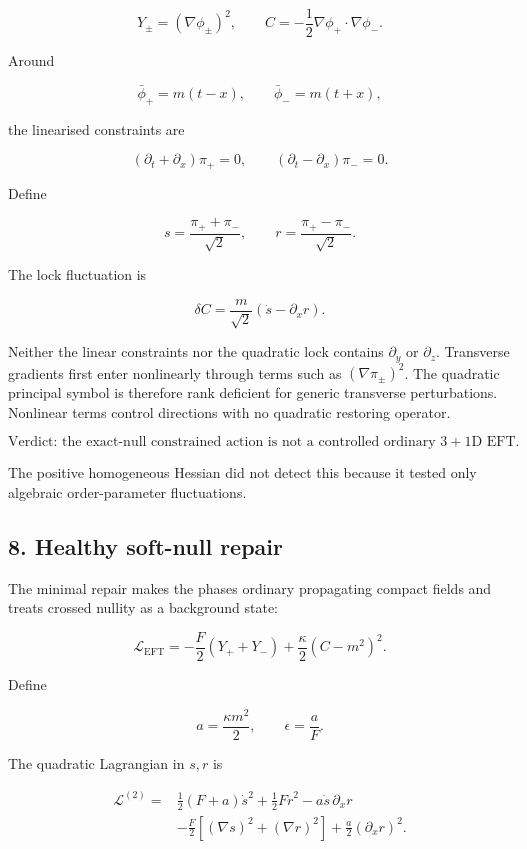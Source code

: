 \documentclass[
]{article}
\begin{document}
\[
Y_\pm=(\nabla\phi_\pm)^2,
\qquad
C=-\frac12\nabla\phi_+\cdot\nabla\phi_-.
\]

Around

\[
\bar\phi_+=m(t-x),
\qquad
\bar\phi_-=m(t+x),
\]

the linearised constraints are

\[
(\partial_t+\partial_x)\pi_+=0,
\qquad
(\partial_t-\partial_x)\pi_-=0.
\]

Define

\[
s=\frac{\pi_++\pi_-}{\sqrt2},
\qquad
r=\frac{\pi_+-\pi_-}{\sqrt2}.
\]

The lock fluctuation is

\[
\delta C=\frac{m}{\sqrt2}(\dot s-\partial_x r).
\]

Neither the linear constraints nor the quadratic lock contains
\(\partial_y\) or \(\partial_z\). Transverse gradients first enter
nonlinearly through terms such as \((\nabla\pi_\pm)^2\). The quadratic
principal symbol is therefore rank deficient for generic transverse
perturbations. Nonlinear terms control directions with no quadratic
restoring operator.

\[
\boxed{
\text{Verdict: the exact-null constrained action is not a controlled ordinary }3+1\text{D EFT.}
}
\]

The positive homogeneous Hessian did not detect this because it tested
only algebraic order-parameter fluctuations.

\subsection{8. Healthy soft-null repair}\label{healthy-soft-null-repair}

The minimal repair makes the phases ordinary propagating compact fields
and treats crossed nullity as a background state:

\[
\boxed{
\mathcal L_{\mathrm{EFT}}
=-\frac F2(Y_++Y_-)
+\frac\kappa2(C-m^2)^2.
}
\]

Define

\[
a=\frac{\kappa m^2}{2},
\qquad
\epsilon=\frac aF.
\]

The quadratic Lagrangian in \(s,r\) is

\[
\begin{aligned}
\mathcal L^{(2)}={}&
\frac12(F+a)\dot s^2
+\frac12F\dot r^2
-a\dot s\,\partial_xr\\
&-\frac F2[(\nabla s)^2+(\nabla r)^2]
+\frac a2(\partial_xr)^2.
\end{aligned}
\]
\end{document}
